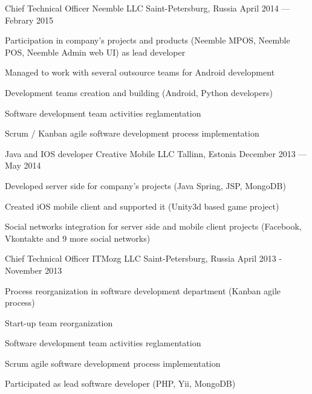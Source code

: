 \begin{cventries}
  \cventry
    {Chief Technical Officer}
    {Neemble LLC}
    {Saint-Petersburg, Russia}
    {April 2014 --- Febrary 2015} %
    {
      \begin{cvitems}
        \item {Participation in company’s projects and products (Neemble MPOS, Neemble POS, Neemble Admin web UI) as lead developer}
        \item {Managed to work with several outsource teams for Android development}
        \item {Development teams creation and building (Android, Python developers)}
        \item {Software development team activities reglamentation}
        \item {Scrum / Kanban agile software development process implementation}
      \end{cvitems}
    }

  \cventry
    {Java and IOS developer}
    {Creative Mobile LLC}
    {Tallinn, Estonia}
    {December 2013 --- May 2014} %
    {
      \begin{cvitems} %
        \item {Developed server side for company’s projects (Java Spring, JSP, MongoDB)}
        \item {Created iOS mobile client and supported it (Unity3d based game project)}
        \item {Social networks integration for server side and mobile client projects (Facebook,
Vkontakte and 9 more social networks)}
      \end{cvitems}
    }

  \cventry
    {Chief Technical Officer} %
    {ITMozg LLC} %
    {Saint-Petersburg, Russia} %
    {April 2013 - November 2013} %
    {
      \begin{cvitems} %
        \item {Process reorganization in software development department (Kanban agile process)}
        \item {Start-up team reorganization}
        \item {Software development team activities reglamentation}
        \item {Scrum agile software development process implementation}
        \item {Participated as lead software developer (PHP, Yii, MongoDB)}
      \end{cvitems}
    }


\end{cventries}
